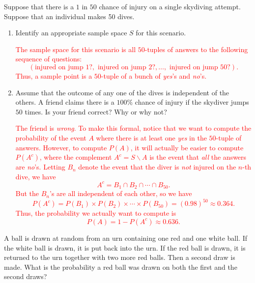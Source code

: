 \documentclass[12pt,reqno]{amsart}
\begin{document}
\bigskip
\prob Suppose that there is a $1$ in $50$ chance of injury on a single skydiving attempt. Suppose that an individual makes 50 dives.

\medskip
\begin{enumerate}
\item Identify an appropriate sample space $S$ for this scenario.
    
\bigskip
\textcolor{red}{The sample space for this scenario is all $50$-tuples of answers to the following sequence of questions:
	\[
	(\text{injured on jump 1?}, \text{ injured on jump 2?}, \ldots, \text{ injured on jump 50?}).
	\]
Thus, a sample point is a $50$-tuple of a bunch of \textit{yes}'s and \textit{no}'s.}
\bigskip

\item Assume that the outcome of any one of the dives is independent of the others. A friend claims there is a $100\%$ chance of injury if the skydiver jumps $50$ times. Is your friend correct? Why or why not?
    
\bigskip
\textcolor{red}{The friend is \textit{wrong}. To make this formal, notice that  we want to compute the probability of the event $A$ where there is at least one \textit{yes} in the $50$-tuple of answers. However, to compute $P(A)$, it will actually be easier to compute $P(A^c)$, where the complement $A^c = S\smallsetminus A$ is the event that \textit{all} the answers are \textit{no}'s. Letting $B_n$ denote the event that the diver is \textit{not} injured on the $n$-th dive, we have
	\[
	A^c = B_1 \cap B_2 \cap \cdots \cap B_{50}.
	\]
But the $B_n$'s are all independent of each other, so we have
	\[
	P(A^c) = P(B_1) \times P(B_2) \times \cdots \times P(B_{50}) = (0.98)^{50} \approx 0.364.
	\]
Thus, the probability we actually want to compute is
	\[
	P(A) = 1 - P(A^c) \approx 0.636.
	\]}
\end{enumerate}

















\bigskip
\prob A ball is drawn at random from an urn containing one red and one white ball. If the white ball is drawn, it is put back into the urn. If the red ball is drawn, it is returned to the urn together with two more red balls. Then a second draw is made. What is the probability a red ball was drawn on both the first and the second draws?
\end{document}
